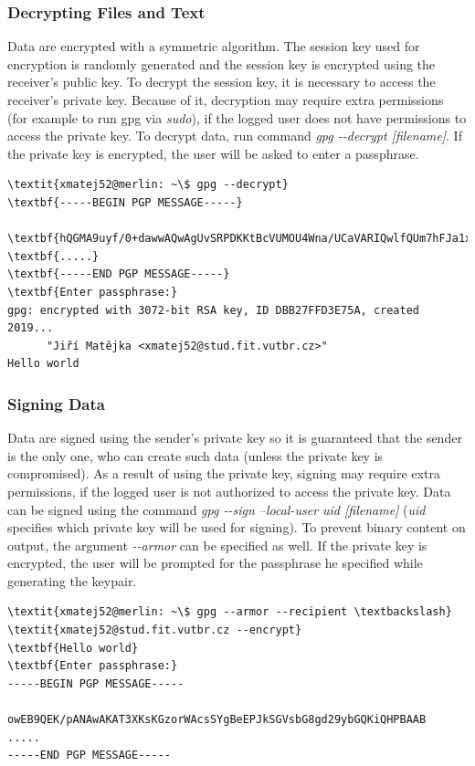 \subsubsection*{Decrypting Files and Text}
Data are encrypted with a symmetric algorithm. The session key used for encryption is randomly generated and the session key is encrypted using the receiver's public key. To decrypt the session key, it is necessary to access the receiver's private key. Because of it, decryption may require extra permissions (for example to run gpg via \textit{sudo}), if the logged user does not have permissions to access the private key. To decrypt data, run command {\textit{gpg -{}-decrypt [filename]}}. If the private key is encrypted, the user will be asked to enter a passphrase.
\begin{Verbatim}[commandchars=\\\{\},codes={\catcode`$=3\catcode`_=8},samepage=false,frame=single]
\textit{xmatej52@merlin: ~\$ gpg --decrypt}
\textbf{-----BEGIN PGP MESSAGE-----}

\textbf{hQGMA9uyf/0+dawwAQwAgUvSRPDKKtBcVUMOU4Wna/UCaVARIQwlfQUm7hFJa1xp}
\textbf{.....}
\textbf{-----END PGP MESSAGE-----}
\textbf{Enter passphrase:}
gpg: encrypted with 3072-bit RSA key, ID DBB27FFD3E75A, created 2019...
      "Jiří Matějka <xmatej52@stud.fit.vutbr.cz>"
Hello world
\end{Verbatim}

\subsubsection*{Signing Data}
Data are signed using the sender's private key so it is guaranteed that the sender is the only one, who can create such data (unless the private key is compromised). As a result of using the private key, signing may require extra permissions, if the logged user is not authorized to access the private key. Data can be signed using the command {\textit{gpg -{}-sign --local-user uid [filename]}} (\textit{uid} specifies which private key will be used for signing). To prevent binary content on output, the argument {\textit{-{}-armor}} can be specified as well. If the private key is encrypted, the user will be prompted for the passphrase he specified while generating the keypair.
\begin{Verbatim}[commandchars=\\\{\},codes={\catcode`$=3\catcode`_=8},samepage=false,frame=single]
\textit{xmatej52@merlin: ~\$ gpg --armor --recipient \textbackslash}
\textit{xmatej52@stud.fit.vutbr.cz --encrypt}
\textbf{Hello world}
\textbf{Enter passphrase:}
-----BEGIN PGP MESSAGE-----

owEB9QEK/pANAwAKAT3XKsKGzorWAcsSYgBeEPJkSGVsbG8gd29ybGQKiQHPBAAB
.....
-----END PGP MESSAGE-----
\end{Verbatim}

